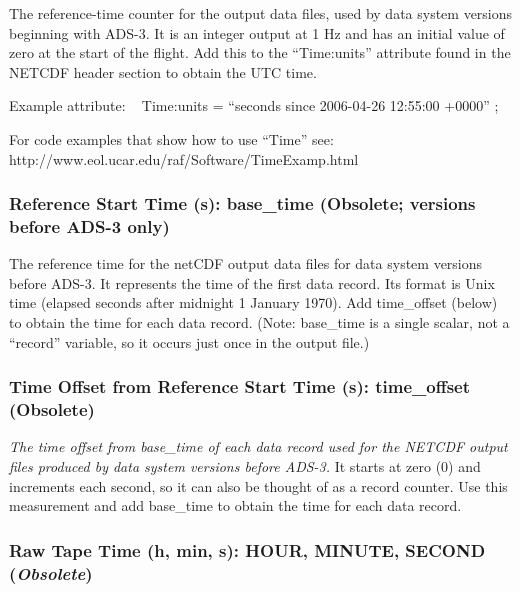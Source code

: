 \documentclass[
  english,
]{book}
\begin{document}
The reference-time counter for the output data files, used by data
system versions beginning with ADS-3. It is an integer output at 1 Hz
and has an initial value of zero at the start of the flight. Add this to
the ``Time:units'' attribute found in the NETCDF header section to
obtain the UTC time.

Example attribute: ~ Time:units = ``seconds since 2006-04-26 12:55:00
+0000'' ;

For code examples that show how to use ``Time'' see:
http://www.eol.ucar.edu/raf/Software/TimeExamp.html

\hypertarget{base-time}{%
\subsubsection*{Reference Start Time (s): base\_time (Obsolete; versions
before ADS-3 only)}\label{base-time}}

The reference time for the netCDF output data files for data system
versions before ADS-3. It represents the time of the first data record.
Its format is Unix time (elapsed seconds after midnight 1 January 1970).
Add time\_offset (below) to obtain the time for each data record. (Note:
base\_time is a single scalar, not a ``record'' variable, so it occurs
just once in the output file.)

\hypertarget{time-offset}{%
\subsubsection*{Time Offset from Reference Start Time (s): time\_offset
(Obsolete)}\label{time-offset}}

\emph{The time offset from base\_time of each data record used for the
NETCDF output files produced by data system versions before ADS-3.} It
starts at zero (0) and increments each second, so it can also be thought
of as a record counter. Use this measurement and add base\_time to
obtain the time for each data record.

\hypertarget{hms}{%
\subsubsection*{\texorpdfstring{Raw Tape Time (h, min, s): HOUR, MINUTE,
SECOND
(\emph{Obsolete})}{Raw Tape Time (h, min, s): HOUR, MINUTE, SECOND (Obsolete)}}\label{hms}}
\end{document}
